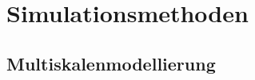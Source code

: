 \chapter{Simulationsmethoden}
\label{cha:simulationsmethoden}

\section{Multiskalenmodellierung}
\label{multiskalenmodellierung}